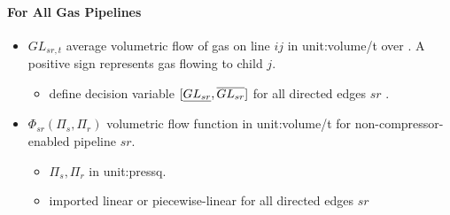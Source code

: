 \paragraph{For All Gas Pipelines}
\begin{itemize}

\item $GL_{sr,t}$ average volumetric flow of gas on line $ij$ in
\gls{unit:volume/t}
over \intervaloft{}. A positive sign represents gas flowing to child
  $j$.  \begin{itemize} \item \gls{define} decision variable
  $[\underline{GL_{sr}}, \overline{GL_{sr}}]$ for all directed edges
  $sr$ \atallt{}.  \end{itemize}

\item $\Phi_{sr}(\Pi_s, \Pi_r)$ volumetric flow function in \gls{unit:volume/t}
for non-compressor-enabled pipeline $sr$.

  \begin{itemize}
  \item $\Pi_s, \Pi_r$ in \gls{unit:pressq}.
  \item \gls{imported} linear or piecewise-linear for all directed edges $sr$
  \end{itemize}

\end{itemize}
